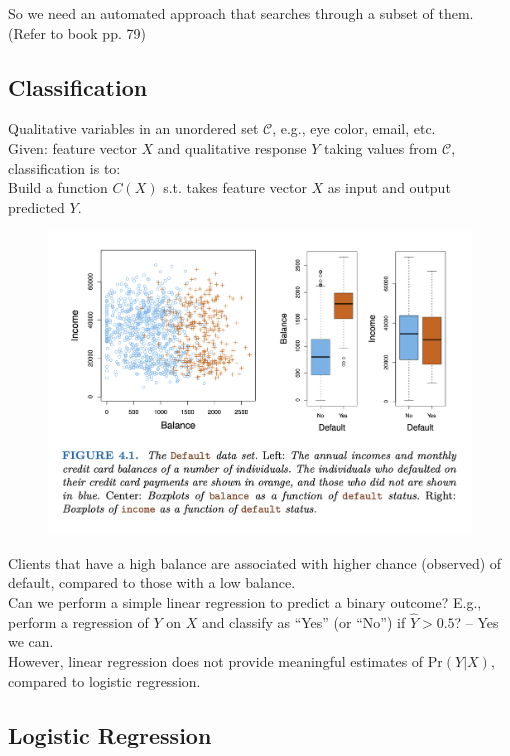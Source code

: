 \documentclass{article}
\begin{document}
So we need an automated approach that searches through a subset of them. (Refer to book pp. 79)

\subsection{Classification}

Qualitative variables in an unordered set $\mathcal{C}$, e.g., eye color, email, etc.\\

Given: feature vector $X$ and qualitative response $Y$ taking values from $\mathcal{C}$, classification is to:\\

Build a function $C(X)$ s.t. takes feature vector $X$ as input and output predicted $Y$.

\newpage

\begin{figure}[h!]
    \centering
    \includegraphics[width=0.75\linewidth]{Classification_income_vs_balance.png}
    \label{fig:income-vs-balance}
\end{figure}

Clients that have a high balance are associated with higher chance (observed) of default, compared to those with a low balance.\\

Can we perform a simple linear regression to predict a binary outcome?
E.g., perform a regression of $Y$ on $X$ and classify as ``Yes'' (or ``No'') if $\hat{Y} > 0.5$? -- Yes we can.\\

However, linear regression does not provide meaningful estimates of $\mathrm{Pr}(Y \vert X)$, compared to logistic regression.

\subsection{Logistic Regression}
\end{document}
